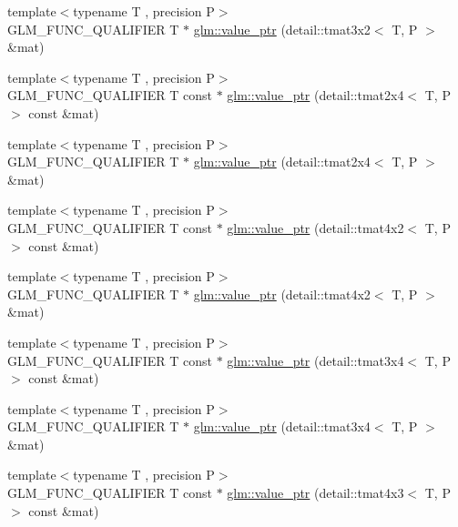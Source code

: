 \begin{DoxyCompactItemize}
\item 
{\footnotesize template$<$typename T , precision P$>$ }\\G\+L\+M\+\_\+\+F\+U\+N\+C\+\_\+\+Q\+U\+A\+L\+I\+F\+I\+ER T $\ast$ \hyperlink{group__gtc__type__ptr_gae2e604002202417c7156db3deeb1301d}{glm\+::value\+\_\+ptr} (detail\+::tmat3x2$<$ T, P $>$ \&mat)
\item 
{\footnotesize template$<$typename T , precision P$>$ }\\G\+L\+M\+\_\+\+F\+U\+N\+C\+\_\+\+Q\+U\+A\+L\+I\+F\+I\+ER T const $\ast$ \hyperlink{group__gtc__type__ptr_ga7b738eac576043c00c39bda2fc515d7b}{glm\+::value\+\_\+ptr} (detail\+::tmat2x4$<$ T, P $>$ const \&mat)
\item 
{\footnotesize template$<$typename T , precision P$>$ }\\G\+L\+M\+\_\+\+F\+U\+N\+C\+\_\+\+Q\+U\+A\+L\+I\+F\+I\+ER T $\ast$ \hyperlink{group__gtc__type__ptr_ga59b17271f4f487e556383b715f9b8534}{glm\+::value\+\_\+ptr} (detail\+::tmat2x4$<$ T, P $>$ \&mat)
\item 
{\footnotesize template$<$typename T , precision P$>$ }\\G\+L\+M\+\_\+\+F\+U\+N\+C\+\_\+\+Q\+U\+A\+L\+I\+F\+I\+ER T const $\ast$ \hyperlink{group__gtc__type__ptr_ga73acc0dbfeeb9e6c09df1f79fd990b84}{glm\+::value\+\_\+ptr} (detail\+::tmat4x2$<$ T, P $>$ const \&mat)
\item 
{\footnotesize template$<$typename T , precision P$>$ }\\G\+L\+M\+\_\+\+F\+U\+N\+C\+\_\+\+Q\+U\+A\+L\+I\+F\+I\+ER T $\ast$ \hyperlink{group__gtc__type__ptr_ga478c7dc470b36836ac5392e852fd2348}{glm\+::value\+\_\+ptr} (detail\+::tmat4x2$<$ T, P $>$ \&mat)
\item 
{\footnotesize template$<$typename T , precision P$>$ }\\G\+L\+M\+\_\+\+F\+U\+N\+C\+\_\+\+Q\+U\+A\+L\+I\+F\+I\+ER T const $\ast$ \hyperlink{group__gtc__type__ptr_ga233effe326542ae9657b8feac80e541f}{glm\+::value\+\_\+ptr} (detail\+::tmat3x4$<$ T, P $>$ const \&mat)
\item 
{\footnotesize template$<$typename T , precision P$>$ }\\G\+L\+M\+\_\+\+F\+U\+N\+C\+\_\+\+Q\+U\+A\+L\+I\+F\+I\+ER T $\ast$ \hyperlink{group__gtc__type__ptr_gad8c6b1dbda2b48d19fd1bc8b01cf701c}{glm\+::value\+\_\+ptr} (detail\+::tmat3x4$<$ T, P $>$ \&mat)
\item 
{\footnotesize template$<$typename T , precision P$>$ }\\G\+L\+M\+\_\+\+F\+U\+N\+C\+\_\+\+Q\+U\+A\+L\+I\+F\+I\+ER T const $\ast$ \hyperlink{group__gtc__type__ptr_gaebe5b66d8b05f6ace85d26cedd03732d}{glm\+::value\+\_\+ptr} (detail\+::tmat4x3$<$ T, P $>$ const \&mat)

\end{DoxyCompactItemize}
